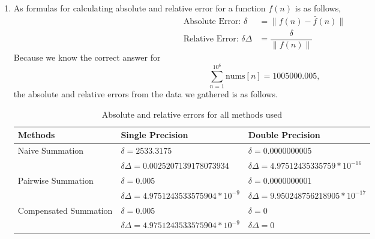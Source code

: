 \documentclass[10pt,a4paper, margin=1in]{article}
\begin{document}
\begin{enumerate}
\begin{enumerate}
    	\item %
    	As formulas for calculating absolute and relative error for a function $f(n)$ is as follows,
    	\begin{align*}
    		\text{Absolute Error: } \delta &= \|f(n)-\bar{f}(n)\| \\
    		\text{Relative Error: } \delta \Delta &= \dfrac{\delta}{\| f(n) \|}
    	\end{align*}
    	Because we know the correct answer for $$\sum_{n=1}^{10^6}\text{nums}[n]= 1005000.005,$$ the absolute and relative errors from the data we gathered is as follows.
    	\begin{table}[H]
    		\centering
    		\caption{Absolute and relative errors for all methods used}
    		\label{tab:Q2.2}
    		\begin{tabular}{l|l|l}
    			Methods & Single Precision & Double Precision\\
				\hline \hline
				\multirow{2}{*}{Naive Summation} & $\delta =  2533.3175$ & $\delta = 0.0000000005$\\
				& $ \delta \Delta = 0.0025207139178073934$ & $\delta \Delta = 4.97512435335759*10^{-16}$\\
				\hline
				\multirow{2}{*}{Pairwise Summation} & $\delta = 0.005 $ & $\delta = 0.0000000001$\\
				& $\delta \Delta = 4.9751243533575904*10^{-9} $ & $\delta \Delta = 9.950248756218905*10^{-17}$\\
				\hline
				\multirow{2}{*}{Compensated Summation} & $\delta = 0.005 $ & $\delta = 0 $\\
				& $\delta \Delta = 4.9751243533575904*10^{-9}$ & $\delta \Delta = 0$\\
    		

\end{tabular}
\end{table}
\end{enumerate}
\end{enumerate}
\end{document}
